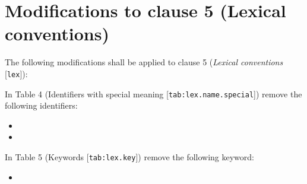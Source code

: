 \section{Modifications to clause 5 (Lexical conventions)}

The following modifications shall be applied to clause 5 (\emph{Lexical
conventions} [\texttt{lex}]):

In Table 4 (Identifiers with special meaning [\texttt{tab:lex.name.special}])
remove the following identifiers:

\begin{itemize}
  \item {}
  \item {}
\end{itemize}


In Table 5 (Keywords [\texttt{tab:lex.key}]) remove the following keyword:

\begin{itemize}
  \item {}
\end{itemize}

